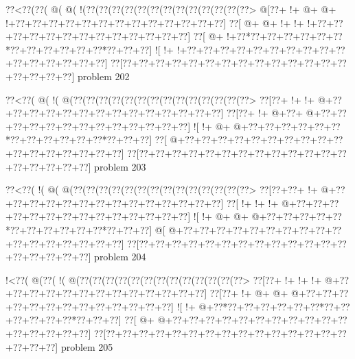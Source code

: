\vbox{\vbox{\goo
\0??<\0??(\0??(\- @(\- @(\- !(\0??(\0??(\0??(\0??(\0??(\0??(\0??(\0??(\0??(\0??(\0??(\0??(\0??>
\- @[\0??+\- !+\- @+\- @+\- !+\0??+\0??+\0??+\0??+\0??+\0??+\0??+\0??+\0??+\0??+\0??+\0??+\0??]
\0??[\- @+\- @+\- !+\- !+\- !+\0??+\0??+\0??+\0??+\0??+\0??+\0??+\0??+\0??+\0??+\0??+\0??+\0??]
\0??[\- @+\- !+\0??*\0??+\0??+\0??+\0??+\0??+\0??*\0??+\0??+\0??+\0??+\0??+\0??*\0??+\0??+\0??]
\- ![\- !+\- !+\0??+\0??+\0??+\0??+\0??+\0??+\0??+\0??+\0??+\0??+\0??+\0??+\0??+\0??+\0??+\0??]
\0??[\0??+\0??+\0??+\0??+\0??+\0??+\0??+\0??+\0??+\0??+\0??+\0??+\0??+\0??+\0??+\0??+\0??+\0??]
}
\hfil problem 202\hfil\break
}



\vbox{\vbox{\goo
\0??<\0??(\- @(\- !(\- @(\0??(\0??(\0??(\0??(\0??(\0??(\0??(\0??(\0??(\0??(\0??(\0??(\0??(\0??>
\0??[\0??+\- !+\- !+\- @+\0??+\0??+\0??+\0??+\0??+\0??+\0??+\0??+\0??+\0??+\0??+\0??+\0??+\0??]
\0??[\0??+\- !+\- @+\0??+\- @+\0??+\0??+\0??+\0??+\0??+\0??+\0??+\0??+\0??+\0??+\0??+\0??+\0??]
\- ![\- !+\- @+\- @+\0??+\0??+\0??+\0??+\0??+\0??*\0??+\0??+\0??+\0??+\0??+\0??*\0??+\0??+\0??]
\0??[\- @+\0??+\0??+\0??+\0??+\0??+\0??+\0??+\0??+\0??+\0??+\0??+\0??+\0??+\0??+\0??+\0??+\0??]
\0??[\0??+\0??+\0??+\0??+\0??+\0??+\0??+\0??+\0??+\0??+\0??+\0??+\0??+\0??+\0??+\0??+\0??+\0??]
}
\hfil problem 203\hfil\break
}



\vbox{\vbox{\goo
\0??<\0??(\- !(\- @(\- @(\0??(\0??(\0??(\0??(\0??(\0??(\0??(\0??(\0??(\0??(\0??(\0??(\0??(\0??>
\0??[\0??+\0??+\- !+\- @+\0??+\0??+\0??+\0??+\0??+\0??+\0??+\0??+\0??+\0??+\0??+\0??+\0??+\0??]
\0??[\- !+\- !+\- !+\- @+\0??+\0??+\0??+\0??+\0??+\0??+\0??+\0??+\0??+\0??+\0??+\0??+\0??+\0??]
\- ![\- !+\- @+\- @+\- @+\0??+\0??+\0??+\0??+\0??*\0??+\0??+\0??+\0??+\0??+\0??*\0??+\0??+\0??]
\- @[\- @+\0??+\0??+\0??+\0??+\0??+\0??+\0??+\0??+\0??+\0??+\0??+\0??+\0??+\0??+\0??+\0??+\0??]
\0??[\0??+\0??+\0??+\0??+\0??+\0??+\0??+\0??+\0??+\0??+\0??+\0??+\0??+\0??+\0??+\0??+\0??+\0??]
}
\hfil problem 204\hfil\break
}



\vbox{\vbox{\goo
\- !<\0??(\- @(\0??(\- !(\- @(\0??(\0??(\0??(\0??(\0??(\0??(\0??(\0??(\0??(\0??(\0??(\0??(\0??>
\0??[\0??+\- !+\- !+\- !+\- @+\0??+\0??+\0??+\0??+\0??+\0??+\0??+\0??+\0??+\0??+\0??+\0??+\0??]
\0??[\0??+\- !+\- @+\- @+\- @+\0??+\0??+\0??+\0??+\0??+\0??+\0??+\0??+\0??+\0??+\0??+\0??+\0??]
\- ![\- !+\- @+\0??*\0??+\0??+\0??+\0??+\0??+\0??*\0??+\0??+\0??+\0??+\0??+\0??*\0??+\0??+\0??]
\0??[\- @+\- @+\0??+\0??+\0??+\0??+\0??+\0??+\0??+\0??+\0??+\0??+\0??+\0??+\0??+\0??+\0??+\0??]
\0??[\0??+\0??+\0??+\0??+\0??+\0??+\0??+\0??+\0??+\0??+\0??+\0??+\0??+\0??+\0??+\0??+\0??+\0??]
}
\hfil problem 205\hfil\break
}



